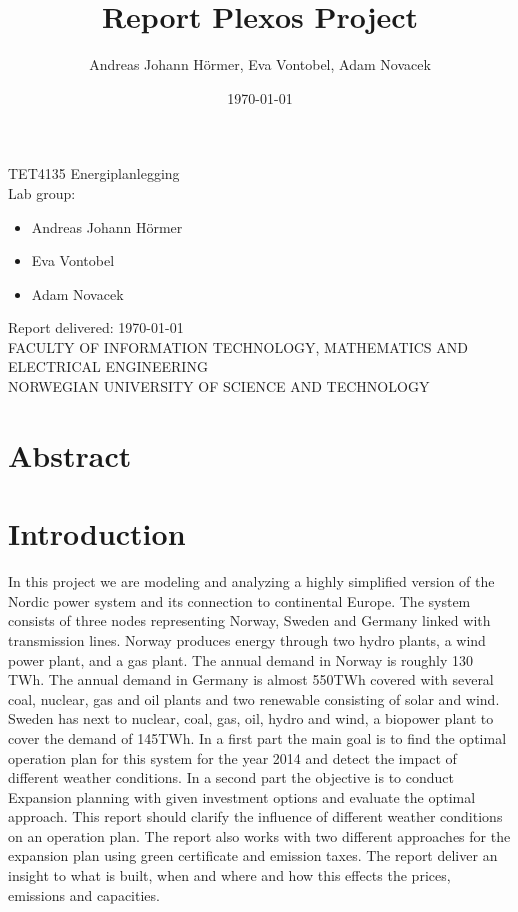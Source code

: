 \documentclass{article}
\title{Report Plexos Project}
\author{Andreas Johann H\"ormer, Eva Vontobel, Adam Novacek}
\date{\today}
\begin{document}
\thispagestyle{empty}
\maketitle
\thispagestyle{empty}
\begin{center}
TET4135 Energiplanlegging\\[3cm]
Lab group:
\begin{itemize}
\item Andreas Johann H\"ormer
\item Eva Vontobel
\item Adam Novacek\\[3cm]
\end{itemize}
Report delivered: \today\\[6cm]
FACULTY OF INFORMATION TECHNOLOGY, MATHEMATICS AND ELECTRICAL ENGINEERING\\
NORWEGIAN UNIVERSITY OF SCIENCE AND TECHNOLOGY
\end{center}
\thispagestyle{empty}
\newpage
\tableofcontents
\thispagestyle{empty}
\newpage
\listoffigures
\thispagestyle{empty}
\newpage
\section*{Abstract}
\thispagestyle{empty}


\newpage
\setcounter{page}{1}
\section{Introduction}
In this project we are modeling and analyzing a highly simplified version of the Nordic power system and its connection to continental Europe. The system consists of three nodes representing Norway, Sweden and Germany linked with transmission lines. Norway produces energy through two hydro plants, a wind power plant, and a gas plant. The annual demand in Norway is roughly 130 TWh. The annual demand in Germany is almost 550TWh covered with several coal, nuclear, gas and oil plants and two renewable consisting of solar and wind. Sweden has next to nuclear, coal, gas, oil, hydro and wind, a biopower plant to cover the demand of 145TWh. In a first part the main goal is to find the optimal operation plan for this system for the year 2014 and detect the impact of different weather conditions. In a second part the objective is to conduct Expansion planning with given investment options and evaluate the optimal approach. This report should clarify the influence of different weather conditions on an operation plan. The report also works with two different approaches for the expansion plan using  green certificate and emission taxes. The report deliver an insight to what is built, when and where and how this effects the prices, emissions and capacities.
\end{document}
